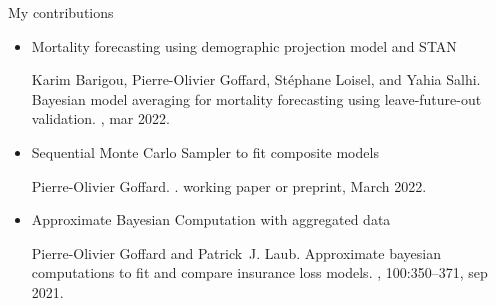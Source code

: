 \documentclass{beamer}
\begin{document}
\begin{frame}{My contributions}
\begin{itemize}
  \item Mortality forecasting using demographic projection model and STAN 
  \tiny
  \begin{thebibliography}{1}

Karim Barigou, Pierre-Olivier Goffard, St{\'{e}}phane Loisel, and Yahia Salhi.
\newblock Bayesian model averaging for mortality forecasting using
  leave-future-out validation.
, mar 2022.
\end{thebibliography}
 \normalsize
\item Sequential Monte Carlo Sampler to fit composite models
  \tiny
  \begin{thebibliography}{1}
Pierre-Olivier Goffard.
.
\newblock working paper or preprint, March 2022.
\end{thebibliography}
 \normalsize
\item Approximate Bayesian Computation with aggregated data
\tiny
\begin{thebibliography}{1}
Pierre-Olivier Goffard and Patrick~J. Laub.
\newblock Approximate bayesian computations to fit and compare insurance loss
  models.
, 100:350--371, sep 2021.

\end{thebibliography}

\end{itemize}

\end{frame}
{ %
    \begin{frame}[plain]
     \end{frame}
}
\end{document}
